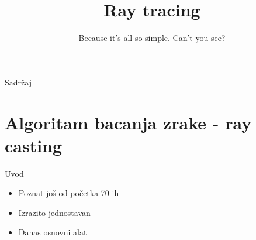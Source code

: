 \documentclass[9pt]{beamer}
\title{Ray tracing}
\subtitle{Because it's all so simple. Can't you see?}
\institute{Računalna grafika}
\begin{document}
\begin{frame}
 \titlepage
\end{frame}

\begin{frame}{Sadržaj}
  \tableofcontents
\end{frame}


\section{Algoritam bacanja zrake - ray casting}
\begin{frame}{Uvod}
\begin{itemize}
	\item Poznat još od početka 70-ih
	\item Izrazito jednostavan
	\item Danas osnovni alat
\end{itemize}
\end{frame}
%
%
\end{document}
